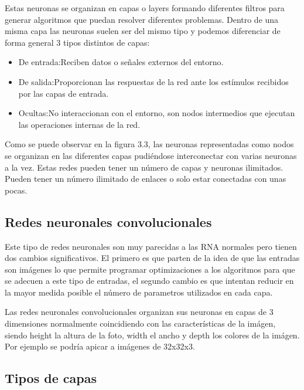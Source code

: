 Estas neuronas se organizan en capas o layers formando diferentes filtros para generar algoritmos que puedan resolver diferentes problemas. Dentro de una misma capa las neuronas suelen ser del mismo tipo y podemos diferenciar de forma general 3 tipos distintos de capas:

\begin{itemize}
	\item{De entrada}:Reciben datos o señales externos del entorno.
	\item{De salida}:Proporcionan las respuestas de la red ante los estímulos recibidos por las capas de entrada.
	\item{Ocultas}:No interaccionan con el entorno, son nodos intermedios que ejecutan las operaciones internas de la red.
\end{itemize}



Como se puede observar en la figura 3.3, las neuronas representadas como nodos se organizan en las diferentes capas pudiéndose interconectar con varias neuronas a la vez. Estas redes pueden tener un número de capas y neuronas ilimitados. Pueden tener un número ilimitado de enlaces o solo estar conectadas con unas pocas.

\subsection{Redes neuronales convolucionales}

Este tipo de redes neuronales son muy parecidas a las RNA normales pero tienen dos cambios significativos. El primero es que parten de la idea de que las entradas son imágenes lo que permite programar optimizaciones a los algoritmos para que se adecuen a este tipo de entradas, el segundo cambio es que intentan reducir en la mayor medida posible el número de parametros utilizados en cada capa.



Las redes neuronales convolucionales organizan sus neuronas en capas de 3 dimensiones normalmente coincidiendo con las características de la imágen, siendo height la altura de la foto, width el ancho y depth los colores de la imágen. Por ejemplo se podría apicar a imágenes de 32x32x3.

\subsection{Tipos de capas}

